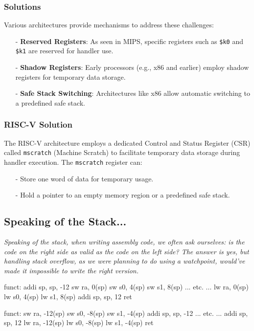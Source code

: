 \subsubsection*{Solutions}
Various architectures provide mechanisms to address these challenges:
\begin{itemize}
    \item[-] \textbf{Reserved Registers}: As seen in MIPS, specific registers such as \texttt{\$k0} and \texttt{\$k1} are reserved for handler use.
    \item[-] \textbf{Shadow Registers}: Early processors (e.g., x86 and earlier) employ shadow registers for temporary data storage.
    \item[-] \textbf{Safe Stack Switching}: Architectures like x86 allow automatic switching to a predefined safe stack.
\end{itemize}

\subsubsection*{RISC-V Solution}
The RISC-V architecture employs a dedicated Control and Status Register (CSR) called \texttt{mscratch} (Machine Scratch) to facilitate temporary data storage during handler execution. The \texttt{mscratch} register can:
\begin{itemize}
    \item[-] Store one word of data for temporary usage.
    \item[-] Hold a pointer to an empty memory region or a predefined safe stack.
\end{itemize}

\subsection{Speaking of the Stack...}
\textit{Speaking of the stack, when writing assembly code, we often ask ourselves: is the code on the right side as valid as the code on the left side? The answer is yes, but handling stack overflow, as we were planning to do using a watchpoint, would've made it impossible to write the right version.} \\
\begin{minipage}[htp]{0.45\textwidth}
\begin{assembly}
funct:
    addi sp, sp, -12
    sw   ra, 0(sp)
    sw   s0, 4(sp)
    sw   s1, 8(sp)
    ... etc. ...
    lw   ra, 0(sp)
    lw   s0, 4(sp)
    lw   s1, 8(sp)
    addi sp, sp, 12
    ret
\end{assembly}
\end{minipage}
\hfill
\vline
\hfill
\begin{minipage}[htp]{0.45\textwidth}
\begin{assembly}
funct:
    sw   ra, -12(sp)
    sw   s0, -8(sp)
    sw   s1, -4(sp)
    addi sp, sp, -12
    ... etc. ...
    addi sp, sp, 12
    lw   ra, -12(sp)
    lw   s0, -8(sp)
    lw   s1, -4(sp)
    ret
\end{assembly}
\end{minipage}

